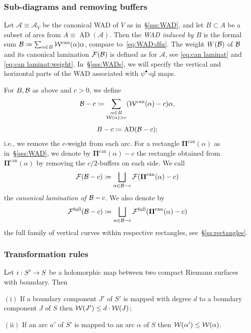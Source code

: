 \documentclass{amsart}
\newcommand\full{{\operatorname{full}}}
\newcommand{\AD}{{\operatorname{AD}}}
\newcommand{\bPi}{{\boldsymbol \Pi}}
\newcommand{\can}{{\operatorname{can}}}
\newcommand{\1}{{\mathbb 1 }}
\newcommand{\Fam}{{\mathcal F}}
\newcommand{\Width}{{\mathcal W}}
\renewcommand{\AA}{{\mathcal A}}
\begin{document}
\subsubsection{Sub-diagrams and removing buffers}\label{sss:sub-diagram} Let $\AA\equiv\AA_V$ be the canonical WAD of $V$ as in~\S\ref{sss:WAD}, and let $B\subset A$ be a subset of arcs from $A\equiv\AD (\AA)$. Then the \emph{WAD induced by $B$} is the formal sum $\BB\coloneqq\sum_{\alpha\in B} \Width^\can(\alpha)\alpha$, compare to~\eqref{eq:WAD:dfn}. The weight $W({\mathcal B})$ of ${\mathcal B}$ and its canonical lamination $\Fam(\BB)$ is defined as for $\AA$, see \eqref{eq:can laminat} and \eqref{eq:can laminat:weight}. In~\S\ref{sss:WADs}, we will specify the vertical and horizontal parts of the WAD associated with $\psi^\bullet$-ql maps. 


For $B,{\mathcal B}$ as above and $c>0$, we define
\[\BB-c \coloneqq \sum_{
\substack{\alpha\in B \\ 
\Width(\alpha)>c}
} (\Width^\can(\alpha)-c)\alpha,\]
\[B-c \coloneqq \AD (\BB-c);\]
i.e., we remove the $c$-weight from each arc. For a rectangle $\bPi^\can(\alpha)$ as  in~\S\ref{sss:WAD}, we denote by $\bPi^\can(\alpha)-c$ the rectangle obtained from $\bPi^\can(\alpha)$ by removing the $c/2$-buffers on each side. We call 
\[\Fam(\BB-c)\coloneqq  \bigsqcup_{\alpha \in \BB-c } \Fam(\bPi^\can(\alpha)-c)\]
the \emph{canonical lamination of ${\mathcal B}-c$}. We also denote by  
\[\Fam^\full(\BB-c)\coloneqq  \bigsqcup_{\alpha \in \BB-c } \Fam^\full(\bPi^\can(\alpha)-c)\]
the full family of vertical curves within respective rectangles, see~\S\ref{ss:rectangles}. 



\subsubsection{Transformation rules}


\begin{lem}\label{generaltransform rules}
Let $i: S' \rightarrow S$ be a  holomorphic map between
two compact  Riemann surfaces with boundary.
Then 

\ssk\nin $ \mathrm{(i)} $  If a boundary component $J' $ of $S'$ is mapped
with degree $d$ to a boundary component $J $ of $S$ then 
$ {\mathcal W}(J')\leq d\cdot {\mathcal W}(J)$;

\ssk\nin $\mathrm { (ii) } $
 If an arc $a ' $ of $S'$ is mapped
to an arc  $\alpha $ of $S$ then ${\mathcal W} (\alpha') \leq {\mathcal W} (\alpha)$.

\end{lem}
\end{document}
